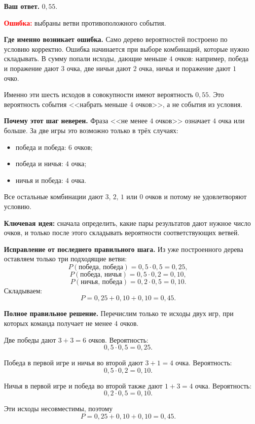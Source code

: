 \documentclass[12pt,a4paper]{article}
\begin{document}
\textbf{Ваш ответ.} $0{,}55$.

\textcolor{red}{\textbf{Ошибка:}} выбраны ветви противоположного события.

\textbf{Где именно возникает ошибка.}
Само дерево вероятностей построено по условию корректно. Ошибка начинается при выборе комбинаций, которые нужно складывать. В сумму попали исходы, дающие меньше $4$ очков: например, победа и поражение дают $3$ очка, две ничьи дают $2$ очка, ничья и поражение дают $1$ очко.

Именно эти шесть исходов в совокупности имеют вероятность $0{,}55$. Это вероятность события <<набрать меньше $4$ очков>>, а не события из условия.

\textbf{Почему этот шаг неверен.}
Фраза <<не менее $4$ очков>> означает $4$ очка или больше. За две игры это возможно только в трёх случаях:
\begin{itemize}
  \item победа и победа: $6$ очков;
  \item победа и ничья: $4$ очка;
  \item ничья и победа: $4$ очка.
\end{itemize}
Все остальные комбинации дают $3$, $2$, $1$ или $0$ очков и потому не удовлетворяют условию.

\textcolor{blue!60!black}{\textbf{Ключевая идея:}} сначала определить, какие пары результатов дают нужное число очков, и только после этого складывать вероятности соответствующих ветвей.

\textbf{Исправление от последнего правильного шага.}
Из уже построенного дерева оставляем только три подходящие ветви:
\[
P(\text{победа, победа})=0{,}5\cdot0{,}5=0{,}25,
\]
\[
P(\text{победа, ничья})=0{,}5\cdot0{,}2=0{,}10,
\]
\[
P(\text{ничья, победа})=0{,}2\cdot0{,}5=0{,}10.
\]
Складываем:
\[
P=0{,}25+0{,}10+0{,}10=0{,}45.
\]

\textbf{Полное правильное решение.}
Перечислим только те исходы двух игр, при которых команда получает не менее $4$ очков.

Две победы дают $3+3=6$ очков. Вероятность:
\[
0{,}5\cdot0{,}5=0{,}25.
\]

Победа в первой игре и ничья во второй дают $3+1=4$ очка. Вероятность:
\[
0{,}5\cdot0{,}2=0{,}10.
\]

Ничья в первой игре и победа во второй также дают $1+3=4$ очка. Вероятность:
\[
0{,}2\cdot0{,}5=0{,}10.
\]

Эти исходы несовместимы, поэтому
\[
P=0{,}25+0{,}10+0{,}10=0{,}45.
\]
\end{document}
